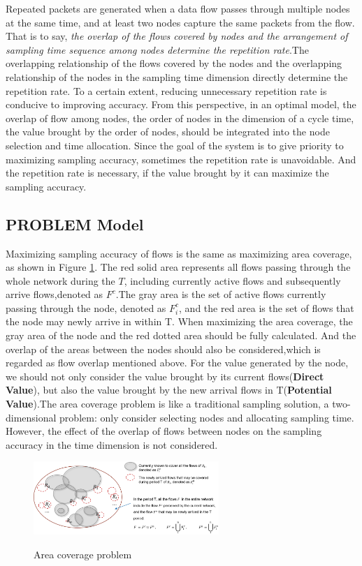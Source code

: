 \documentclass[conference]{IEEEtran}
\begin{document}
Repeated packets are generated when a data flow passes through multiple nodes at the same time, and at least two nodes capture the same packets from the flow. %
That is to say, \emph{the overlap of the flows covered by nodes and the arrangement of sampling time sequence among nodes determine the repetition rate}.The overlapping relationship of the flows covered by the nodes and the overlapping relationship of the nodes in the sampling time dimension directly determine the repetition rate.
To a certain extent, reducing unnecessary repetition rate is conducive to improving accuracy.
From this perspective, in an optimal model, the overlap of flow among nodes, the order of nodes in the  dimension of a cycle time, the value brought by the order of nodes, should be integrated into the node selection and time allocation. 
Since the goal of the system is to give priority to maximizing sampling accuracy, sometimes the repetition rate is unavoidable. And the repetition rate is necessary, if the value brought by it can maximize the sampling accuracy.

\subsection{PROBLEM Model}
Maximizing sampling accuracy of flows is the same as maximizing area coverage, as shown in Figure \ref{fig_1_model}.
The red solid area represents all flows passing through the whole network during the $T$, including currently active flows and subsequently arrive flows,denoted as $F^c$.The gray area is the set of active flows currently passing through the node, denoted as $F_i^c$, and the red area is the set of flows that the node may newly arrive in within T.
When maximizing the area coverage, the gray area of the node and the red dotted area should be fully calculated. And the overlap of the areas between the nodes should also be considered,which is regarded as flow overlap mentioned above.
For the value generated by the node, we should not only consider the value brought by its current flows(\textbf{Direct Value}), but also the value brought by the new arrival flows in T(\textbf{Potential Value}).The area coverage problem is like a traditional sampling solution, a two-dimensional problem: only consider selecting nodes and allocating sampling time. However, the effect of the overlap of flows between nodes on the sampling accuracy in the time dimension is not considered.
\begin{figure}[!!!!!!!!!!!!!!hhhhhhhhhht]
\centering

\includegraphics[width=7cm]{images/area_coverage.png}
\label{fig_1_area}

\caption{Area coverage problem}
\label{fig_1_model}
\end{figure}
\end{document}

